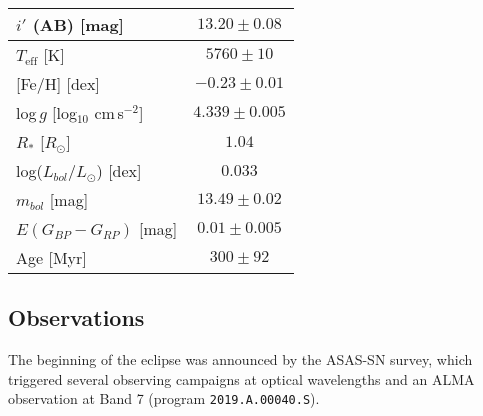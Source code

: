 \documentclass[sn-nature,oneside]{sn-jnl}%
\newcommand{\teff}{$T_\mathrm{eff}$}
\newcommand{\rsun}{$R_\odot$}
\begin{document}
\begin{table}
\begin{tabular}{@{}lc@{}}
         $i'$ (AB) {[}mag{]}                     & $13.20\pm0.08$\footnotemark[4]   \\
        \hline
         \teff{} [K]                            & $5760\pm10$\footnotemark[1]  \\
         {[}Fe/H{]} [dex]                       & $-0.23\pm0.01$\footnotemark[1] \\
         log\,$g$ [log$_{10}$ cm\,s$^{-2}$]     & $4.339\pm0.005$\footnotemark[1]  \\
         $R_*$ [\rsun{}]                        & $1.04$\footnotemark[5] \\
         log($L_{bol}/L_{\odot}$) [dex]         & $0.033$\footnotemark[5] \\
         $m_{bol}$ [mag]                        & $13.49\pm0.02$\footnotemark[6] \\
         $E(G_{BP}-G_{RP})$ {[}mag{]}           & $0.01 \pm 0.005$\footnotemark[6]    \\
         Age [Myr]                              & $300\pm92$\footnotemark[7] \\
         
        \hline
    \end{tabular}

\label{tab:Stellarprop}
\end{table}


\subsection*{Observations}\label{sec:obs}

The beginning of the eclipse was announced \cite{RizzoSmith21} by the ASAS-SN survey, which triggered several observing campaigns at optical wavelengths and an ALMA observation at Band 7 (program \texttt{2019.A.00040.S}).
%
\end{document}
